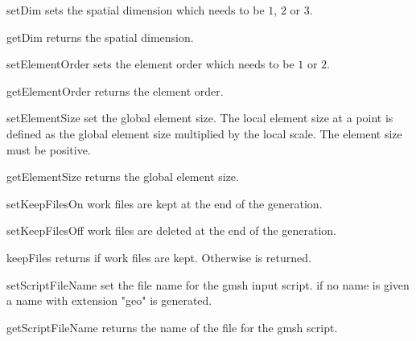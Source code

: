 \begin{methoddesc}[Design]{setDim}{}
sets the spatial dimension which needs to be $1$, $2$ or $3$.
\end{methoddesc}

\begin{methoddesc}[Design]{getDim}{}
returns the spatial dimension.
\end{methoddesc}

\begin{methoddesc}[Design]{setElementOrder}{}
sets the element order which needs to be $1$ or $2$.
\end{methoddesc}

\begin{methoddesc}[Design]{getElementOrder}{}
returns the element order.
\end{methoddesc}

\begin{methoddesc}[Design]{setElementSize}{}
set the global element size. The local element size at a point is defined as 
the global element size multiplied by the local scale. The element size must be positive.
\end{methoddesc}


\begin{methoddesc}[Design]{getElementSize}{}
returns the global element size.
\end{methoddesc}



\begin{methoddesc}[Design]{setKeepFilesOn}{}
work files are kept at the end of the generation.
\end{methoddesc}

\begin{methoddesc}[Design]{setKeepFilesOff}{}
work files are deleted at the end of the generation.
\end{methoddesc}

\begin{methoddesc}[Design]{keepFiles}{}
returns \True if work files are kept. Otherwise \False is returned.
\end{methoddesc}

\begin{methoddesc}[Design]{setScriptFileName}{}
set the file name for the gmsh input script. if no name is given a name with extension "geo" is generated.
\end{methoddesc}

\begin{methoddesc}[Design]{getScriptFileName}{}
returns the name of the file for the gmsh script.
\end{methoddesc}


